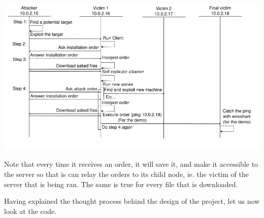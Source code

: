 \documentclass[../main.tex]{subfiles}
\begin{document}
    \includegraphics[width=450pt]{botnet_flow.png}

    Note that every time it receives an order, it will save it, and make it accessible to the server so that is can relay the orders to its child node, ie. the victim of the server that is being ran.
    The same is true for every file that is downloaded.

    Having explained the thought process behind the design of the project, let us now look at the code.
\end{document}
